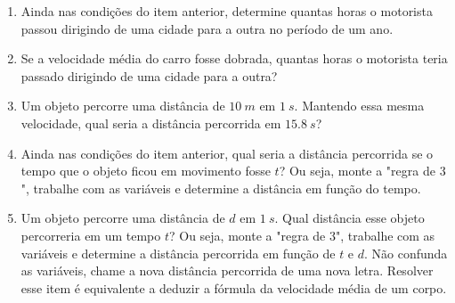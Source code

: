 \documentclass[12pt]{report}
\newcommand{\1}{\faThermometerEmpty}
\newcommand{\2}{\faThermometerQuarter}
\newcommand{\3}{\faThermometerHalf}
\newcommand{\4}{\faThermometerThreeQuarters}
\newcommand{\5}{\faThermometerFull}
\begin{document}
\begin{enumerate}
\begin{enumerate}
\item Ainda nas condições do item anterior, determine quantas horas o motorista passou dirigindo de uma cidade para a outra no período de um ano.
\item Se a velocidade média do carro fosse dobrada, quantas horas o motorista teria passado dirigindo de uma cidade para a outra?
\item Um objeto percorre uma distância de $10\ m$ em $1\ s$. Mantendo essa mesma velocidade, qual seria a distância percorrida em $15.8\ s$?
\item \2 Ainda nas condições do item anterior, qual seria a distância percorrida se o tempo que o objeto ficou em movimento fosse $t$? Ou seja, monte a "regra de $3$", trabalhe com as variáveis e determine a distância em função do tempo.
\item \3 Um objeto percorre uma distância de $d$ em $1\ s$. Qual distância esse objeto percorreria em um tempo $t$? Ou seja, monte a "regra de $3$", trabalhe com as variáveis e determine a distância percorrida em função de $t$ e $d$. Não confunda as variáveis, chame a nova distância percorrida de uma nova letra. Resolver esse item é equivalente a deduzir a fórmula da velocidade média de um corpo. 

\end{enumerate}


\end{enumerate}
\end{document}
